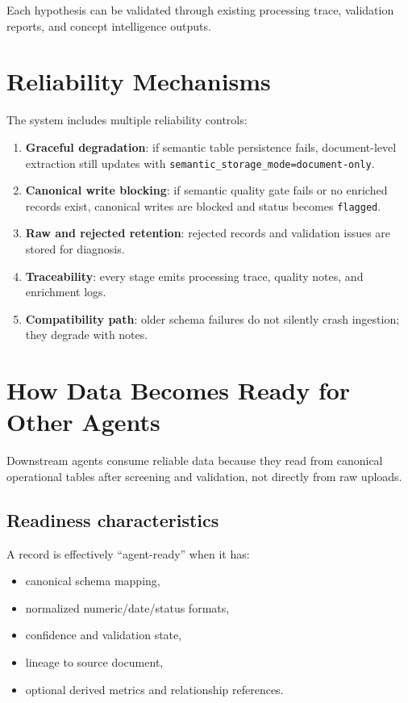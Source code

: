 \documentclass[11pt,a4paper]{article}
\begin{document}
Each hypothesis can be validated through existing processing trace, validation reports, and concept intelligence outputs.

\section{Reliability Mechanisms}
The system includes multiple reliability controls:
\begin{enumerate}[leftmargin=*]
  \item \textbf{Graceful degradation}: if semantic table persistence fails, document-level extraction still updates with \texttt{semantic\_storage\_mode=document-only}.
  \item \textbf{Canonical write blocking}: if semantic quality gate fails or no enriched records exist, canonical writes are blocked and status becomes \texttt{flagged}.
  \item \textbf{Raw and rejected retention}: rejected records and validation issues are stored for diagnosis.
  \item \textbf{Traceability}: every stage emits processing trace, quality notes, and enrichment logs.
  \item \textbf{Compatibility path}: older schema failures do not silently crash ingestion; they degrade with notes.
\end{enumerate}

\section{How Data Becomes Ready for Other Agents}
Downstream agents consume reliable data because they read from canonical operational tables after screening and validation, not directly from raw uploads.

\subsection{Readiness characteristics}
A record is effectively ``agent-ready'' when it has:
\begin{itemize}[leftmargin=*]
  \item canonical schema mapping,
  \item normalized numeric/date/status formats,
  \item confidence and validation state,
  \item lineage to source document,
  \item optional derived metrics and relationship references.
\end{itemize}
\end{document}
